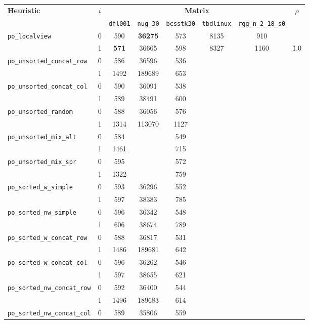 \begin{table}[h]
	\centering
	\begin{tabular}{|l|c||c|c|c|c|c||c|}
\hline
\multirow{2}{*}{\textbf{Heuristic}} & \multirow{2}{*}{$i$} &  \multicolumn{5}{|c||}{\textbf{Matrix}} & \multirow{2}{*}{$\rho$} \\ \cline{3-7}
& & \texttt{dfl001} & \texttt{nug\_30} & \texttt{bcsstk30} & \texttt{tbdlinux} & \texttt{rgg\_n\_2\_18\_s0} & \\ \hline
\verb|po_localview| & 0 & 590  & \textbf{36275} & 573 & 8135 & 910 & \\ 
& 1 & \textbf{571} & 36665 & 598 & 8327 & 1160  & \multirow{-2}{*}{\~1.0} \\ \hline
\verb|po_unsorted_concat_row| & 0 & 586 & 36596 & 536 & &  \\ %
& 1 & 1492 & 189689 & 653 & & \\\hline
\verb|po_unsorted_concat_col| & 0 & 590 & 36091 & 538 \\ %
& 1 & 589 & 38491  & 600 \\\hline
\verb|po_unsorted_random| & 0 & 588 & 36056 & 576 \\ %
 & 1 & 1314 & 113070 & 1127 \\ \hline
\verb|po_unsorted_mix_alt| & 0 & 584 & & 549 \\ %
 & 1 & 1461 & & 715 \\ \hline
\verb|po_unsorted_mix_spr| & 0 & 595 & & 572 \\ %
 & 1 & 1322 & & 759 \\ \hline
\verb|po_sorted_w_simple| & 0 & 593 & 36296 & 552 \\ %
 & 1 & 597 & 38383 & 785 \\ \hline
\verb|po_sorted_nw_simple| & 0 & 596 & 36342 & 548 \\ %
 & 1 & 606 & 38674 & 789 \\ \hline
\verb|po_sorted_w_concat_row| & 0 & 588 & 36817 & 531 \\ %
 & 1 & 1486 & 189681 & 642 \\ \hline
\verb|po_sorted_w_concat_col| & 0 & 596 & 36262  & 546 \\ %
 & 1 & 597 & 38655 & 621 \\ \hline
\verb|po_sorted_nw_concat_row| & 0 & 592 & 36400 & 544 \\ %
 & 1 & 1496 & 189683 & 614 \\ \hline
\verb|po_sorted_nw_concat_col| & 0 & 589 & 35806 & 559 \\ %

\end{tabular}
\end{table}

